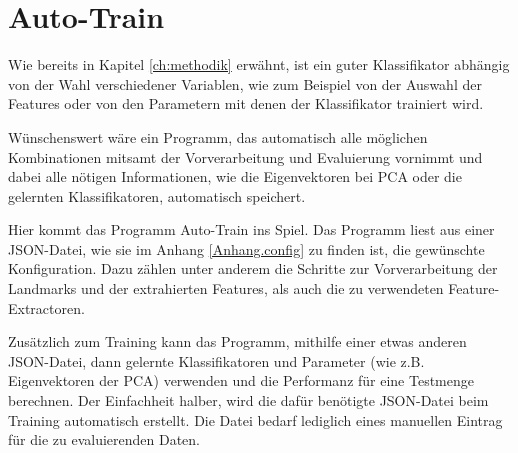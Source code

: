 \section{Auto-Train}
Wie bereits in Kapitel \ref{ch:methodik} erwähnt, ist ein guter Klassifikator abhängig von der Wahl verschiedener Variablen, wie zum Beispiel
von der Auswahl der Features oder von den Parametern mit denen der Klassifikator trainiert wird.

Wünschenswert wäre ein Programm, das automatisch alle möglichen Kombinationen mitsamt der Vorverarbeitung und Evaluierung vornimmt und dabei alle nötigen Informationen, wie die Eigenvektoren bei PCA oder die gelernten Klassifikatoren, automatisch speichert.

Hier kommt das Programm Auto-Train ins Spiel. Das Programm liest aus einer JSON-Datei, wie sie im Anhang \ref{Anhang.config} zu finden ist, die gewünschte Konfiguration. Dazu zählen unter anderem die Schritte zur Vorverarbeitung der Landmarks und der extrahierten Features, als auch die zu verwendeten Feature-Extractoren. 

Zusätzlich zum Training kann das Programm, mithilfe einer etwas anderen JSON-Datei, dann gelernte Klassifikatoren und Parameter (wie z.B. Eigenvektoren der PCA) verwenden und die Performanz für eine Testmenge berechnen.
Der Einfachheit halber, wird die dafür benötigte JSON-Datei beim Training automatisch erstellt. Die Datei bedarf lediglich eines manuellen Eintrag für die zu evaluierenden Daten.






